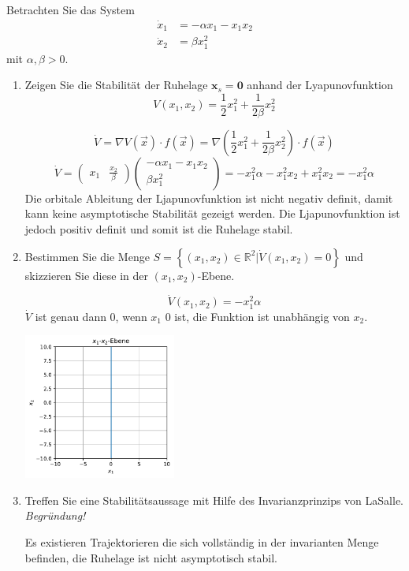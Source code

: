 \documentclass[crop=false]{standalone}
\begin{document}
\begin{task}
Betrachten Sie das System
\[ 
\begin{aligned} \dot{x}_{1} &=-\alpha x_{1}-x_{1} x_{2} \\ \dot{x}_{2} &=\beta x_{1}^{2} \end{aligned}
 \]
 mit $\alpha, \beta>0$.
 \begin{enumerate}[i]
     \item Zeigen Sie die Stabilität der Ruhelage $\mathbf{x}_{s}=\mathbf{0}$ anhand der Lyapunovfunktion
     \[ 
V\left(x_{1}, x_{2}\right)=\frac{1}{2} x_{1}^{2}+\frac{1}{2 \beta} x_{2}^{2}
 \]
 \begin{solution}
    \[\dot{V} = \nabla V(\vec{x}) \cdot f(\vec{x}) = \nabla \left( \frac{1}{2} x_{1}^{2}+\frac{1}{2 \beta} x_{2}^{2} \right) \cdot f(\vec{x})\]
    \[\dot{V} = \begin{pmatrix}
    x_1 & \frac{x_2}{\beta}
    \end{pmatrix}
    \begin{pmatrix}
    -\alpha x_1 - x_1 x_2 \\
    \beta x_1^2
    \end{pmatrix}
    = - x_1^2 \alpha - x_1^2 x_2 + x_1^2 x_2
    = -x_1^2 \alpha
    \]
    Die orbitale Ableitung der Ljapunovfunktion ist nicht negativ definit, damit kann keine asymptotische Stabilität gezeigt werden. Die Ljapunovfunktion ist jedoch positiv definit und somit ist die Ruhelage stabil.
    \end{solution}
 \item Bestimmen Sie die Menge $S=\left\{\left(x_{1}, x_{2}\right) \in \mathbb{R}^{2} | \dot{V}\left(x_{1}, x_{2}\right)=0\right\}$ und skizzieren Sie diese in der $\left(x_{1}, x_{2}\right)$-Ebene.
 \begin{solution}
    \[\dot{V}\left(x_{1}, x_{2}\right)=-x_1^2 \alpha\]
    $\dot{V}$ ist genau dann $0$, wenn $x_1$ $0$ ist, die Funktion ist unabhängig von $x_2$.
    
        {\centering
        \includegraphics[width = 5cm]{x1x2.pdf}
        \par}
    \end{solution}
\item Treffen Sie eine Stabilitätsaussage mit Hilfe des Invarianzprinzips von LaSalle. \emph{Begründung!}
\begin{solution}
    Es existieren Trajektorieren die sich vollständig in der invarianten Menge befinden, die Ruhelage ist nicht asymptotisch stabil.
    \end{solution}
 \end{enumerate}
\end{task}
\end{document}
